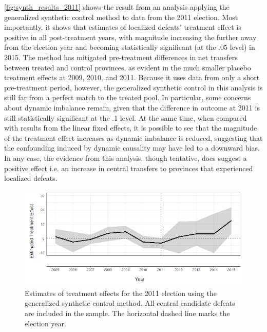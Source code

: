 \documentclass[12pt]{article}
\newcommand{\1}{\mathbbm{1}}
\begin{document}
\autoref{fig:synth_results_2011} shows the result from an analysis applying the generalized synthetic control method \citep{Xu2017gsynth} to data from the 2011 election. Most importantly, it shows that estimates of localized defeats' treatment effect is positive in all post-treatment years, with magnitude increasing the further away from the election year and becoming statistically significant (at the .05 level) in 2015. The method has mitigated pre-treatment differences in net transfers between treated and control provinces, as evident in the much smaller placebo treatment effects at 2009, 2010, and 2011. Because it uses data from only a short pre-treatment period, however, the generalized synthetic control in this analysis is still far from a perfect match to the treated pool. In particular, some concerns about dynamic imbalance remain, given that the difference in outcome at 2011 is still statistically significant at the .1 level. At the same time, when compared with results from the linear fixed effects, it is possible to see that the magnitude of the treatment effect increases as dynamic imbalance is reduced, suggesting that the confounding induced by dynamic causality may have led to a downward bias. In any case, the evidence from this analysis, though tentative, does suggest a positive effect i.e. an increase in central transfers to provinces that experienced localized defeats.

\begin{figure}[!h]
	\centering
	\includegraphics[width=\textwidth]{figure/200202_synth_results_2011.png}
	\captionsetup{singlelinecheck=off}
	\caption[Estimated synthetic control treatment effects for 2011]{Estimates of treatment effects for the 2011 election using the generalized synthetic control method. All central candidate defeats are included in the sample. The horizontal dashed line marks the election year.}
	\label{fig:synth_results_2011}
\end{figure}
\end{document}
